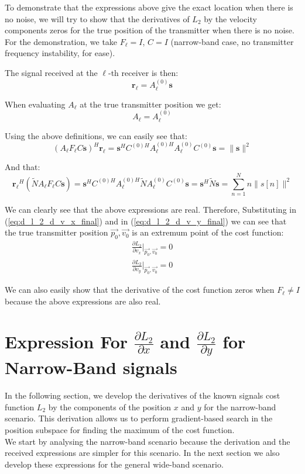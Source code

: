 To demonstrate that the expressions above give the exact location when there is no noise, we will try to show that the derivatives of $L_2$ by the velocity components zeros for the true position of the transmitter when there is no noise.\\
For the demonstration, we take $F_\ell=I$, $C=I$ (narrow-band case, no transmitter frequency instability, for ease).

The signal received at the $\ell$-th receiver is then: 
\begin{equation}
\mathbf{r_\ell} = A_\ell^{(0)} \mathbf{s}
\end{equation}

When evaluating $A_\ell$ at the true transmitter position we get: 
\begin{equation}
A_\ell = A_\ell^{(0)}
\end{equation}

Using the above definitions, we can easily see that:
\begin{equation}
(A_\ell F_\ell C \mathbf{s})^H \mathbf{r_\ell} = \mathbf{s}^H C^{(0)H} A_\ell^{(0)H} A_\ell^{(0)} C^{(0)} \mathbf{s} = 
\|\mathbf{s}\|^2
\end{equation}

And that:
\begin{equation}
\mathbf{r_\ell}^H (\tilde{N}A_\ell F_\ell C \mathbf{s}) = 
\mathbf{s}^H C^{(0)H} A_\ell^{(0)H} \tilde{N} A_\ell^{(0)} C^{(0)} \mathbf{s} = 
\mathbf{s}^H  \tilde{N} \mathbf{s} = \sum_{n=1}^Nn\|s[n]\|^2
\end{equation}

We can clearly see that the above expressions are real. Therefore, Substituting in (\ref{eq:d_l_2_d_v_x_final}) and in (\ref{eq:d_l_2_d_v_y_final}) we can see that the true transmitter position $\vec{p_0},\vec{v_0}$ is an extremum point of the cost function:
\begin{eqnarray}
\frac{\partial L_2}{\partial v_x}|_{\vec{p_0},\vec{v_0}} = 0 \\
\frac{\partial L_2}{\partial v_y}|_{\vec{p_0},\vec{v_0}}= 0 \nonumber
\end{eqnarray}

We can also easily show that the derivative of the cost function zeros when $F_\ell \neq I$ because the
above expressions are also real.

\section{Expression For $\frac{\partial L_2}{\partial x}$ and $\frac{\partial L_2}{\partial y}$ for Narrow-Band signals}
\label{d_L2_dx_d_y_NB}
In the following section, we develop the derivatives of the known signals cost function $L_2$ by the components of the position $x$ and $y$ for the narrow-band scenario. This derivation allows us to perform gradient-based search in the position subspace for finding the maximum of the cost function.\\
We start by analysing the narrow-band scenario because the derivation and the received expressions are simpler for this scenario. In the next section we also develop these expressions for the general wide-band scenario.\\

